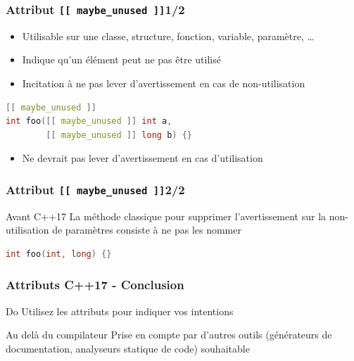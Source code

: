 \documentclass[C++.tex]{subfiles}
\begin{document}
\begin{frame}[fragile]
	\frametitle{Attribut \lstinline|[[ maybe_unused ]]|\titlehfill{}1/2}
	\begin{itemize}
		\item Utilisable sur une classe, structure, fonction, variable, paramètre, \ldots
		\item Indique qu'un élément peut ne pas être utilisé
		\item Incitation à ne pas lever d'avertissement en cas de non-utilisation
	\end{itemize}

	\begin{lstlisting}[language=C++]
[[ maybe_unused ]]
int foo([[ maybe_unused ]] int a,
        [[ maybe_unused ]] long b) {}\end{lstlisting}

	\begin{itemize}
		\item Ne devrait pas lever d'avertissement en cas d'utilisation
	\end{itemize}
\end{frame}

\begin{frame}[fragile]
	\frametitle{Attribut \lstinline|[[ maybe_unused ]]|\titlehfill{}2/2}
	\begin{block}{Avant C++17}
		La méthode \og classique\fg{} pour supprimer l'avertissement sur la non-utilisation de paramètres consiste à ne pas les nommer
		\begin{lstlisting}[language=C++]
int foo(int, long) {}\end{lstlisting}

	\end{block}
\end{frame}

\begin{frame}[fragile]
	\frametitle{Attributs C++17 - Conclusion}
	\begin{exampleblock}{Do}
		Utilisez les attributs pour indiquer vos intentions

	\end{exampleblock}

	\begin{block}{Au delà du compilateur}
		Prise en compte par d'autres outils (générateurs de documentation, analyseurs statique de code) souhaitable
	\end{block}
\end{frame}
\end{document}

